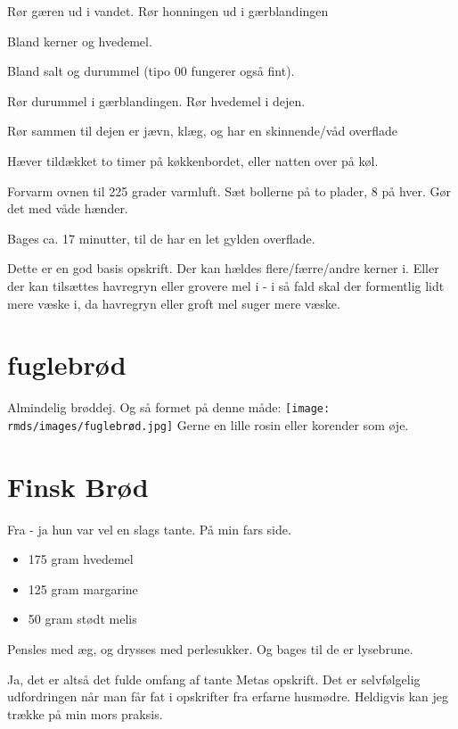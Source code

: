 \documentclass[
  letterpaper,
  DIV=11,
  numbers=noendperiod]{scrreprt}
\providecommand{\tightlist}{%
  \setlength{\itemsep}{0pt}\setlength{\parskip}{0pt}}\usepackage{longtable,booktabs,array}
\begin{document}
Rør gæren ud i vandet. Rør honningen ud i gærblandingen

Bland kerner og hvedemel.

Bland salt og durummel (tipo 00 fungerer også fint).

Rør durummel i gærblandingen. Rør hvedemel i dejen.

Rør sammen til dejen er jævn, klæg, og har en skinnende/våd overflade

Hæver tildækket to timer på køkkenbordet, eller natten over på køl.

Forvarm ovnen til 225 grader varmluft. Sæt bollerne på to plader, 8 på
hver. Gør det med våde hænder.

Bages ca. 17 minutter, til de har en let gylden overflade.

Dette er en god basis opskrift. Der kan hældes flere/færre/andre kerner
i. Eller der kan tilsættes havregryn eller grovere mel i - i så fald
skal der formentlig lidt mere væske i, da havregryn eller groft mel
suger mere væske.

\hypertarget{fuglebruxf8d}{%
\section{fuglebrød}\label{fuglebruxf8d}}

Almindelig brøddej. Og så formet på denne måde:
\texttt{[image: rmds/images/fuglebrød.jpg]} Gerne en lille rosin eller
korender som øje.

\hypertarget{finsk-bruxf8d}{%
\section{Finsk Brød}\label{finsk-bruxf8d}}

Fra - ja hun var vel en slags tante. På min fars side.

\begin{itemize}
\tightlist
\item
  175 gram hvedemel
\item
  125 gram margarine
\item
  50 gram stødt melis
\end{itemize}

Pensles med æg, og drysses med perlesukker. Og bages til de er
lysebrune.

Ja, det er altså det fulde omfang af tante Metas opskrift. Det er
selvfølgelig udfordringen når man får fat i opskrifter fra erfarne
husmødre. Heldigvis kan jeg trække på min mors praksis.
\end{document}

